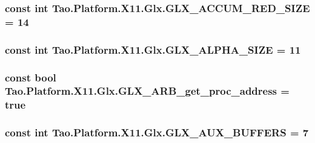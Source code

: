 \label{class_tao_1_1_platform_1_1_x11_1_1_glx_a18384deeeed23b36efad9c2e843377a3}
\hypertarget{class_tao_1_1_platform_1_1_x11_1_1_glx_af539ffb0cf59b67d9cd59de3c7badeae}{
\subsubsection[{GLX\_\-ACCUM\_\-RED\_\-SIZE}]{\setlength{\rightskip}{0pt plus 5cm}const int {\bf Tao.Platform.X11.Glx.GLX\_\-ACCUM\_\-RED\_\-SIZE} = 14}}
\label{class_tao_1_1_platform_1_1_x11_1_1_glx_af539ffb0cf59b67d9cd59de3c7badeae}
\hypertarget{class_tao_1_1_platform_1_1_x11_1_1_glx_a60b9bf01361cb10bda18c677fa76b549}{
\subsubsection[{GLX\_\-ALPHA\_\-SIZE}]{\setlength{\rightskip}{0pt plus 5cm}const int {\bf Tao.Platform.X11.Glx.GLX\_\-ALPHA\_\-SIZE} = 11}}
\label{class_tao_1_1_platform_1_1_x11_1_1_glx_a60b9bf01361cb10bda18c677fa76b549}
\hypertarget{class_tao_1_1_platform_1_1_x11_1_1_glx_adb5a151af7d9da78988c566d4000dac3}{
\subsubsection[{GLX\_\-ARB\_\-get\_\-proc\_\-address}]{\setlength{\rightskip}{0pt plus 5cm}const bool {\bf Tao.Platform.X11.Glx.GLX\_\-ARB\_\-get\_\-proc\_\-address} = true}}
\label{class_tao_1_1_platform_1_1_x11_1_1_glx_adb5a151af7d9da78988c566d4000dac3}
\hypertarget{class_tao_1_1_platform_1_1_x11_1_1_glx_a0147fc8ab93b951f8d7f463bac372e0a}{
\subsubsection[{GLX\_\-AUX\_\-BUFFERS}]{\setlength{\rightskip}{0pt plus 5cm}const int {\bf Tao.Platform.X11.Glx.GLX\_\-AUX\_\-BUFFERS} = 7}}
